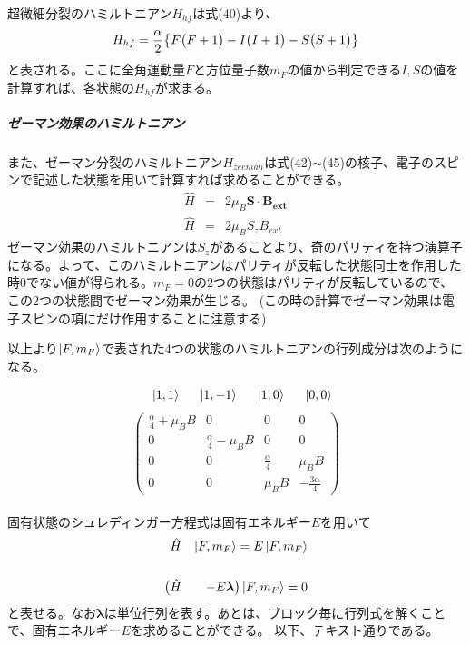 \documentclass[11pt,a4paper]{jsarticle}
\begin{document}
超微細分裂のハミルトニアン$H_{hf}$は式(40)より、
\begin{equation}
  H_{hf} = \frac{\alpha}{2} \bigl\{ F\bigl(F+1\bigr) - I\bigl(I+1\bigr) - S\bigl(S+1\bigr) \bigr\}\\
\end{equation}
と表される。ここに全角運動量$F$と方位量子数$m_F$の値から判定できる$I,S$の値を計算すれば、各状態の$H_{hf}$が求まる。
\\
\subparagraph{ゼーマン効果のハミルトニアン}
また、ゼーマン分裂のハミルトニアン$H_{zeeman}$は式(42)$\sim$(45)の核子、電子のスピンで記述した状態を用いて計算すれば求めることができる。
\begin{eqnarray}
  \hat{H} &=& 2 \mu_B \bm{S} \cdot \bm{B_{ext}}\\
  \hat{H} &=& 2 \mu_B S_z B_{ext}
\end{eqnarray}
ゼーマン効果のハミルトニアンは$S_z$があることより、奇のパリティを持つ演算子になる。よって、このハミルトニアンはパリティが反転した状態同士を作用した時0でない値が得られる。$m_F=0$の2つの状態はパリティが反転しているので、この2つの状態間でゼーマン効果が生じる。
(この時の計算でゼーマン効果は電子スピンの項にだけ作用することに注意する)

以上より$\ket{F,m_F}$で表された4つの状態のハミルトニアンの行列成分は次のようになる。

\[
\begin{array}{cccc}
 ~~~\ket{1,1}~~ & \ket{1,-1}~~ & \ket{1,0}~~ & \ket{0,0}\\
\end{array}
\]
\[
\left(
\begin{array}{cccc}
　\frac{\alpha}{4}+\mu_B B & 0 & 0 & 0 \\
　0 & \frac{\alpha}{4}-\mu_B B & 0 & 0 \\
　0 & 0 & \frac{\alpha}{4} & \mu_B B \\
　0 & 0 & \mu_B B & -\frac{3\alpha}{4}
\end{array}
\right)
\]
\\
固有状態のシュレディンガー方程式は固有エネルギー$E$を用いて
\begin{eqnarray}
  &\hat{H}& \ket{F,m_F} = E\ket{F,m_F}\\
  \nonumber\\
  \bigl(&\hat{H}&-E\bm{\lambda}\bigr)\ket{F,m_F} = 0
\end{eqnarray}
と表せる。なお$\bm{\lambda}$は単位行列を表す。あとは、ブロック毎に行列式を解くことで、固有エネルギー$E$を求めることができる。
以下、テキスト通りである。
\\
\\
\end{document}
